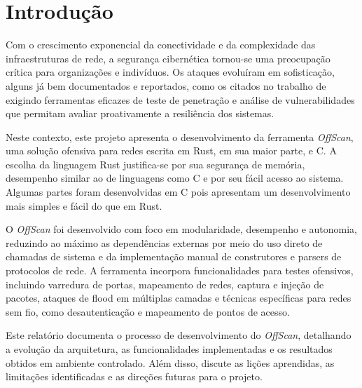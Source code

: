 \section{Introdução}
Com o crescimento exponencial da conectividade e da complexidade das infraestruturas de rede, a segurança cibernética tornou-se uma preocupação crítica para organizações e indivíduos. Os ataques evoluíram em sofisticação, alguns já bem documentados e reportados, como os citados no trabalho de \citet{lari-anto} exigindo ferramentas eficazes de teste de penetração e análise de vulnerabilidades que permitam avaliar proativamente a resiliência dos sistemas.

Neste contexto, este projeto apresenta o desenvolvimento da ferramenta \textit{OffScan}, uma solução ofensiva para redes escrita em Rust, em sua maior parte, e C. A escolha da linguagem Rust justifica-se por sua segurança de memória, desempenho similar ao de linguagens como C e por seu fácil acesso ao sistema. Algumas partes foram desenvolvidas em C pois apresentam um desenvolvimento mais simples e fácil do que em Rust.

O \textit{OffScan} foi desenvolvido com foco em modularidade, desempenho e autonomia, reduzindo ao máximo as dependências externas por meio do uso direto de chamadas de sistema e da implementação manual de construtores e parsers de protocolos de rede. A ferramenta incorpora funcionalidades para testes ofensivos, incluindo varredura de portas, mapeamento de redes, captura e injeção de pacotes, ataques de flood em múltiplas camadas e técnicas específicas para redes sem fio, como desautenticação e mapeamento de pontos de acesso.

Este relatório documenta o processo de desenvolvimento do \textit{OffScan}, detalhando a evolução da arquitetura, as funcionalidades implementadas e os resultados obtidos em ambiente controlado. Além disso, discute as lições aprendidas, as limitações identificadas e as direções futuras para o projeto.
